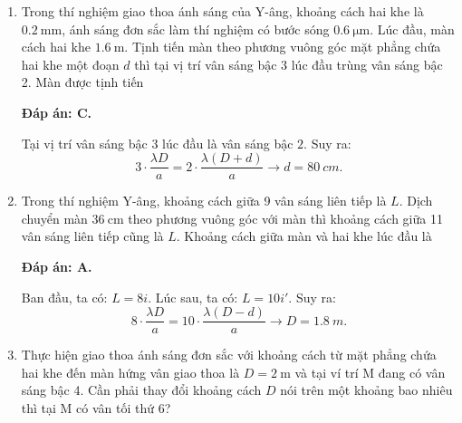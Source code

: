 \begin{enumerate}[label=\bfseries Câu \arabic*:]
{	}
	
	\item {}
	
	\cauhoi
	{Trong thí nghiệm giao thoa ánh sáng của Y-âng, khoảng cách hai khe là $\SI{0.2}{\milli \meter}$, ánh sáng đơn sắc làm thí nghiệm có bước sóng $\SI{0.6}{\micro \meter}$. Lúc đầu, màn cách hai khe $\SI{1.6}{\meter}$. Tịnh tiến màn theo phương vuông góc mặt phẳng chứa hai khe một đoạn $d$ thì tại vị trí vân sáng bậc 3 lúc đầu trùng vân sáng bậc 2. Màn được tịnh tiến
	}
	
	\loigiai
	{		\textbf{Đáp án: C.}
		
Tại vị trí vân sáng bậc $ 3 $ lúc đầu là vân sáng bậc $ 2 $. Suy ra:
$$
	3 \cdot \dfrac{\lambda D}{a} = 2 \cdot \dfrac{\lambda (D+d)}{a} \rightarrow d = \SI{80}{cm}.
$$
		
	}
	
	\item {} 
	
	\cauhoi
	{Trong thí nghiệm Y-âng, khoảng cách giữa 9 vân sáng liên tiếp là $L$. Dịch chuyển màn $\SI{36}{\centi \meter}$ theo phương vuông góc với màn thì khoảng cách giữa 11 vân sáng liên tiếp cũng là $L$. Khoảng cách giữa màn và hai khe lúc đầu là
	}
	
	\loigiai
	{		\textbf{Đáp án: A.}
		
Ban đầu, ta có: $ L = 8i. $ Lúc sau, ta có: $ L = 10i' $. Suy ra:
$$
	8 \cdot \dfrac{\lambda D}{a} = 10 \cdot \dfrac{\lambda (D-d)}{a} \rightarrow D = \SI{1,8}{m}.
$$
			
	}
	
	\item {} 
	
	\cauhoi
	{Thực hiện giao thoa ánh sáng đơn sắc với khoảng cách từ mặt phẳng chứa hai khe đến màn hứng vân giao thoa là $D=\SI{2}{\meter}$ và tại ví trí M đang có vân sáng bậc 4. Cần phải thay đổi khoảng cách $D$ nói trên một khoảng bao nhiêu thì tại M có vân tối thứ 6?
	}	
	

\end{enumerate}
